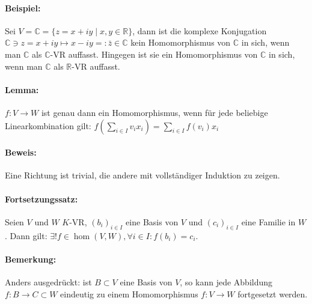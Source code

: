 \paragraph{Beispiel:}
	Sei $V = \mathbb{C} = \{z = x+iy\mid x,y\in \mathbb{R}\}$, dann ist die komplexe Konjugation $\mathbb{C}\ni z = x+iy \mapsto x-iy =: \bar{z} \in \mathbb{C}$ kein Homomorphismus von $\mathbb{C}$ in sich, wenn man $\mathbb{C}$ als $\mathbb{C}$-VR auffasst. Hingegen ist sie ein Homomorphismus von $\mathbb{C}$ in sich, wenn man $\mathbb{C}$ als $ \mathbb{R} $-VR auffasst.
\paragraph{Lemma:}
	$f:V\to W$ ist genau dann ein Homomorphismus, wenn für jede beliebige Linearkombination gilt: $f(\sum_{i\in I}v_ix_i) = \sum_{i\in I}f(v_i)x_i$

\paragraph{Beweis:}
	Eine Richtung ist trivial, die andere mit vollständiger Induktion zu zeigen.

\paragraph{Fortsetzungssatz:} 
	Seien $ V $ und $ W $ $K$-VR, $(b_i)_{i\in I}$ eine Basis von $ V $ und $(c_i)_{i\in I}$ eine Familie in $ W $.
	Dann gilt: $\exists!f\in \hom(V,W), \forall i\in I: f(b_i) = c_i$.
    
\paragraph{Bemerkung:}
        Anders ausgedrückt: ist $B\subset V$ eine Basis von $ V $, so kann jede Abbildung $f: B\to C\subset W$ eindeutig zu einem Homomorphismus $f: V\to W$ fortgesetzt werden.
    
